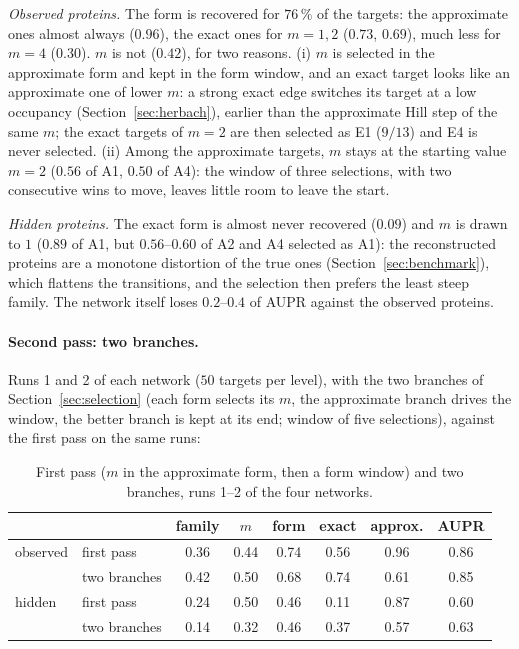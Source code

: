\documentclass[a4paper, 11pt]{article}
\theoremstyle{plain}
\theoremstyle{remark}
\begin{document}
\emph{Observed proteins.} The form is recovered for $76\,\%$ of the targets: the approximate ones almost always ($0.96$), the exact ones for $m = 1, 2$ ($0.73$, $0.69$), much less for $m = 4$ ($0.30$). $m$ is not ($0.42$), for two reasons. (i) $m$ is selected in the approximate form and kept in the form window, and an exact target looks like an approximate one of lower $m$: a strong exact edge switches its target at a low occupancy (Section~\ref{sec:herbach}), earlier than the approximate Hill step of the same $m$; the exact targets of $m = 2$ are then selected as E1 ($9/13$) and E4 is never selected. (ii) Among the approximate targets, $m$ stays at the starting value $m = 2$ ($0.56$ of A1, $0.50$ of A4): the window of three selections, with two consecutive wins to move, leaves little room to leave the start.

\emph{Hidden proteins.} The exact form is almost never recovered ($0.09$) and $m$ is drawn to $1$ ($0.89$ of A1, but $0.56$--$0.60$ of A2 and A4 selected as A1): the reconstructed proteins are a monotone distortion of the true ones (Section~\ref{sec:benchmark}), which flattens the transitions, and the selection then prefers the least steep family. The network itself loses $0.2$--$0.4$ of AUPR against the observed proteins.

\paragraph{Second pass: two branches.} Runs 1 and 2 of each network ($50$ targets per level), with the two branches of Section~\ref{sec:selection} (each form selects its $m$, the approximate branch drives the window, the better branch is kept at its end; window of five selections), against the first pass on the same runs:

\begin{table}[h]
\centering\small
\begin{tabular}{llcccccc}
\toprule
 & & family & $m$ & form & exact & approx. & AUPR \\
\midrule
observed & first pass & 0.36 & 0.44 & 0.74 & 0.56 & 0.96 & 0.86 \\
 & two branches & 0.42 & 0.50 & 0.68 & 0.74 & 0.61 & 0.85 \\
\midrule
hidden & first pass & 0.24 & 0.50 & 0.46 & 0.11 & 0.87 & 0.60 \\
 & two branches & 0.14 & 0.32 & 0.46 & 0.37 & 0.57 & 0.63 \\
\bottomrule
\end{tabular}
\caption{First pass ($m$ in the approximate form, then a form window) and two branches, runs 1--2 of the four networks.}
\label{tab:branches}
\end{table}
\end{document}

